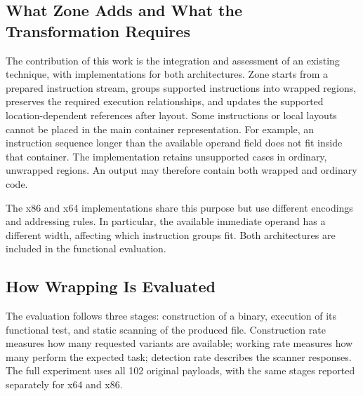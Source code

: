 \subsection{What Zone Adds and What the Transformation Requires}
The contribution of this work is the integration and assessment of an
existing technique, with implementations for both architectures. Zone
starts from a prepared instruction stream, groups supported instructions
into wrapped regions, preserves the required execution relationships, and
updates the supported location-dependent references after layout. Some
instructions or local layouts cannot be placed in the main container
representation. For example, an instruction sequence longer than the
available operand field does not fit inside that container. The
implementation retains unsupported cases in ordinary, unwrapped regions. An output may therefore contain both wrapped and ordinary code.

The x86 and x64 implementations share this purpose but use different
encodings and addressing rules. In particular, the available immediate
operand has a different width, affecting which instruction groups fit.
Both architectures are included in the functional evaluation.

\subsection{How Wrapping Is Evaluated}
The evaluation follows three stages: construction of a binary, execution
of its functional test, and static scanning of the produced file.
Construction rate measures how many requested variants are available;
working rate measures how many perform the expected task; detection rate
describes the scanner responses. The full experiment uses all 102 original
payloads, with the same stages reported separately for x64 and x86.
